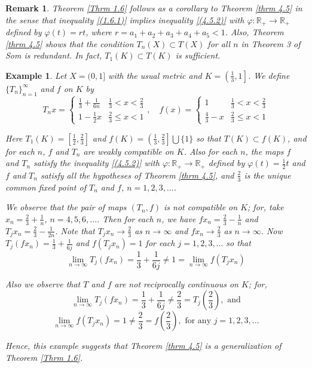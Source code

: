 \documentclass[a4paper,12pt,oneside]{article}
\newtheorem{remark}[theorem]{Remark}
\newtheorem{example}[theorem]{Example}
\numberwithin{equation}{section}
\begin{document}
\begin{remark}
    Theorem \eqref{Thrm 1.6} follows as a corollary to Theorem \eqref{thrm 4.5} in the sense that inequality \eqref{(1.6.1)} implies inequality \eqref{(4.5.2)} with $\varphi:\mathbb{R}_{+}\to \mathbb{R}_{+}$ defined by $\varphi(t)=rt$, where $r=a_{1}+a_{2}+a_{3}+a_{4}+a_{5}<1$. Also, Theorem \eqref{thrm 4.5} shows that the condition $T_{n}(X)\subset T(X)$ for all $n$ in Theorem 3 of Som \cite{Som2003} is redundant. In fact, $T_{1}(K)\subset T(K)$ is sufficient.
\end{remark}

\begin{example}
    Let $X=(0,1]$ with the usual metric and $K=\left(\frac{1}{3},1\right]$. We define $\{T_{n}\}_{n=1}^{\infty}$ and $f$ on $K$ by
    \[
    T_n x = \begin{cases} 
        \frac{1}{3} + \frac{1}{6n} & \frac{1}{3} < x < \frac{2}{3} \\
        1 - \frac{1}{2}x & \frac{2}{3} \leq x < 1 
    \end{cases}, \quad
    f(x) = \begin{cases} 
        1 & \frac{1}{3} < x < \frac{2}{3} \\
        \frac{4}{3} - x & \frac{2}{3} \leq x < 1 
    \end{cases}
    \]

Here $T_{1}(K)=\left[\frac{1}{2},\frac{2}{3}\right]$ and $f(K)=\left(\frac{1}{3},\frac{2}{3}\right]\bigcup\{1\}$ so that $T(K)\subset f(K)$, and for each $n$, $f$ and $T_{n}$ are weakly compatible on $K$. Also for each $n$, the maps $f$ and $T_{n}$ satisfy the inequality \eqref{(4.5.2)} with $\varphi:\mathbb{R}_{+}\to \mathbb{R}_{+}$ defined by $\varphi(t)=\frac{1}{2}t$ and $f$ and $T_{n}$ satisfy all the hypotheses of Theorem \eqref{thrm 4.5}, and $\frac{2}{3}$ is the unique common fixed point of $T_{n}$ and $f$, $n=1,2,3,...$.

We observe that the pair of maps $(T_{n},f)$ is not compatible on $K$; for, take $x_{n}=\frac{2}{3}+\frac{1}{n}$, $n=4,5,6,...$. Then for each $n$, we have $fx_{n}=\frac{2}{3}-\frac{1}{n}$ and $T_{j}x_{n}=\frac{2}{3}-\frac{1}{2n}$. Note that $T_{j}x_{n}\rightarrow\frac{2}{3}$ as $n\rightarrow\infty$ and $fx_{n}\rightarrow\frac{2}{3}$ as $n\rightarrow\infty$. Now $T_{j}(fx_{n})=\frac{1}{3}+\frac{1}{6j}$ and $f(T_{j}x_{n})=1$ for each $j=1,2,3,...$ so that
\[
\lim_{n\rightarrow\infty}T_{j}(fx_{n})=\frac{1}{3}+\frac{1}{6j}\neq 1=\lim_{n\rightarrow\infty}f(T_{j}x_{n})
\]

Also we observe that $T$ and $f$ are not reciprocally continuous on $K$; for,
\[
\lim_{n\rightarrow\infty}T_{j}(fx_{n})=\frac{1}{3}+\frac{1}{6j}\neq\frac{2}{3}= T_{j}\left(\frac{2}{3}\right), \text{ and}
\]
\[
\lim_{n\rightarrow\infty}f(T_{j}x_{n})=1\neq\frac{2}{3}=f\left(\frac{2}{3}\right), \text{ for any } j=1,2,3,...
\]

Hence, this example suggests that Theorem \eqref{thrm 4.5} is a generalization of Theorem \eqref{Thrm 1.6}.
\end{example}
\end{document}

